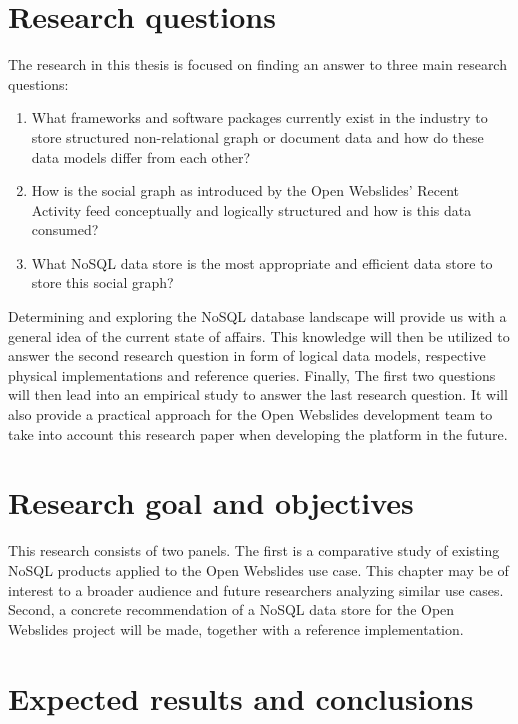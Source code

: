 \clearpage{}

\section{Research questions}
\label{sec:research-questions}

The research in this thesis is focused on finding an answer to three main research questions:

\begin{enumerate}
  \item What frameworks and software packages currently exist in the industry to store structured non-relational graph or document data and how do these data models differ from each other?
  \item How is the social graph as introduced by the Open Webslides' Recent Activity feed conceptually and logically structured and how is this data consumed?
  \item What NoSQL data store is the most appropriate and efficient data store to store this social graph?
\end{enumerate}

Determining and exploring the NoSQL database landscape will provide us with a general idea of the current state of affairs.
This knowledge will then be utilized to answer the second research question in form of logical data models, respective physical implementations and reference queries.
Finally, The first two questions will then lead into an empirical study to answer the last research question.
It will also provide a practical approach for the Open Webslides development team to take into account this research paper when developing the platform in the future.

\section{Research goal and objectives}
\label{sec:research-goal-and-objectives}

This research consists of two panels.
The first is a comparative study of existing NoSQL products applied to the Open Webslides use case.
This chapter may be of interest to a broader audience and future researchers analyzing similar use cases.
Second, a concrete recommendation of a NoSQL data store for the Open Webslides project will be made, together with a reference implementation.

\section{Expected results and conclusions}
\label{sec:expected-results-and-conclusions}

